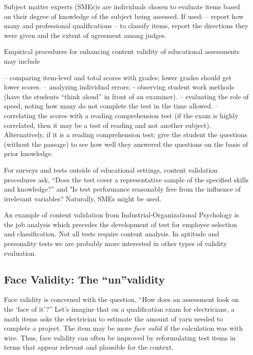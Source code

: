 \documentclass[
  english,
]{book}
\begin{document}
Subject matter experts (SMEs)s are individuals chosen to evaluate items based on their degree of knowledge of the subject being assessed. If used:
-- report how many and professional qualifications
-- to classify items, report the directions they were given and the extent of agreement among judges.

Empirical procedures for enhancing content validity of educational assessments may include

-- comparing item-level and total scores with grades; lower grades should get lower scores.
-- analyzing individual errors;
- observing student work methods (have the students ``think aloud'' in front of an examiner).
-- evaluating the role of speed, noting how many do not complete the test in the time allowed.
-- correlating the scores with a reading comprehension test (if the exam is highly correlated, then it may be a test of reading and not another subject). Alternatively, if it is a reading comprehension test; give the student the questions (without the passage) to see how well they answered the questions on the basis of prior knowledge.

For surveys and tests outside of educational settings, content validation procedures ask, ``Does the test cover a representative sample of the specified skills and knowledge?'' and "Is test performance reasonably free from the influence of irrelevant variables? Naturally, SMEs might be used.

An example of content validation from Industrial-Organizational Psychology is the job analysis which precedes the development of test for employee selection and classification.
Not all tests require content analysis. In aptitude and personality tests we are probably more interested in other types of validity evaluation.

\hypertarget{face-validity-the-unvalidity}{%
\subsection{Face Validity: The ``un''validity}\label{face-validity-the-unvalidity}}

Face validity is concerned with the question, ``How does an assessment look on the `face of it'?'' Let's imagine that on a qualification exam for electricians, a math items asks the electrician to estimate the amount of yarn needed to complete a project. The item may be more \emph{face valid} if the calculation was with wire. Thus, face validity can often be improved by reformulating test items in terms that appear relevant and plausible for the context.
\end{document}
